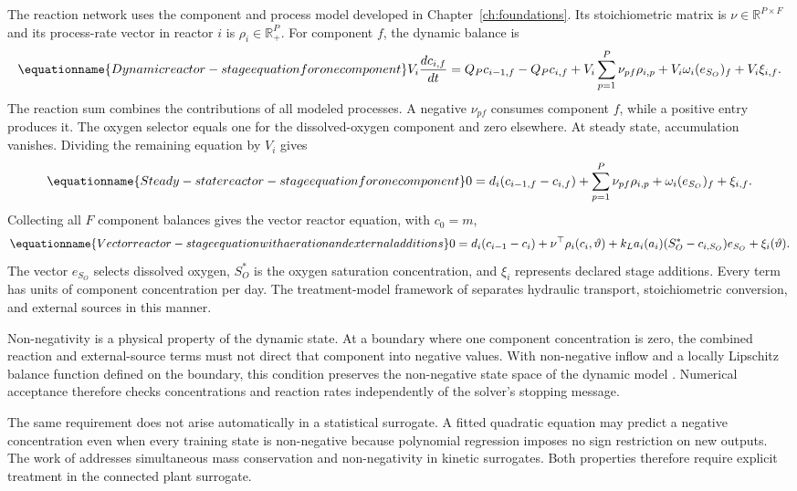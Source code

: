 The reaction network uses the component and process model developed in Chapter~\ref{ch:foundations}. Its stoichiometric matrix is $\nu\in\mathbb R^{P\times F}$ and its process-rate vector in reactor $i$ is $\rho_i\in\mathbb R_+^P$. For component $f$, the dynamic balance is
\begin{equation}
\equationname{Dynamic reactor-stage equation for one component}
V_i\frac{dc_{i,f}}{dt}=Q_Pc_{i-1,f}-Q_Pc_{i,f}
+V_i\sum_{p=1}^{P}\nu_{pf}\rho_{i,p}+V_i\omega_i(e_{S_O})_f+V_i\xi_{i,f}.
\end{equation}
The reaction sum combines the contributions of all modeled processes. A negative $\nu_{pf}$ consumes component $f$, while a positive entry produces it. The oxygen selector equals one for the dissolved-oxygen component and zero elsewhere. At steady state, accumulation vanishes. Dividing the remaining equation by $V_i$ gives
\begin{equation}
\equationname{Steady-state reactor-stage equation for one component}
0=d_i(c_{i-1,f}-c_{i,f})+\sum_{p=1}^{P}\nu_{pf}\rho_{i,p}
+\omega_i(e_{S_O})_f+\xi_{i,f}.
\end{equation}
Collecting all $F$ component balances gives the vector reactor equation, with $c_0=m$,
\begin{equation}
\equationname{Vector reactor-stage equation with aeration and external additions}
0=d_i(c_{i-1}-c_i)+\nu^\top\rho_i(c_i,\vartheta)
+k_La_i(a_i)(S_O^*-c_{i,S_O})e_{S_O}+\xi_i(\vartheta).
\label{eq:plant_reactor}
\end{equation}
The vector $e_{S_O}$ selects dissolved oxygen, $S_O^*$ is the oxygen saturation concentration, and $\xi_i$ represents declared stage additions. Every term has units of component concentration per day. The treatment-model framework of \citet{Henze2006} separates hydraulic transport, stoichiometric conversion, and external sources in this manner.

Non-negativity is a physical property of the dynamic state. At a boundary where one component concentration is zero, the combined reaction and external-source terms must not direct that component into negative values. With non-negative inflow and a locally Lipschitz balance function defined on the boundary, this condition preserves the non-negative state space of the dynamic model \citep{Haddad2010}. Numerical acceptance therefore checks concentrations and reaction rates independently of the solver's stopping message.

The same requirement does not arise automatically in a statistical surrogate. A fitted quadratic equation may predict a negative concentration even when every training state is non-negative because polynomial regression imposes no sign restriction on new outputs. The work of \citet{KircherVotsmeier2025} addresses simultaneous mass conservation and non-negativity in kinetic surrogates. Both properties therefore require explicit treatment in the connected plant surrogate.

